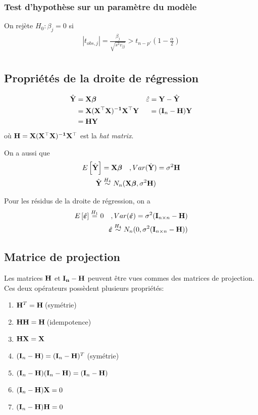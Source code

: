 \documentclass[10pt, french]{article}
\begin{document}
\begin{multicols*}{3}
\subsubsection*{Test d'hypothèse sur un paramètre du modèle}
On rejète $H_0 : \beta_j = 0$ si
\begin{align*}
|t_{obs, j}| = \frac{\beta_j}{\sqrt{s^2 v_{jj}} } > t_{n-p'}\left(1 - \frac{\alpha}{2} \right) \\
\end{align*}

\subsection*{Propriétés de la droite de régression}
\begin{align*}
	\hat{\mathbf{Y}}	& = \mathbf{X} \bm{\beta}  &&\hat{\varepsilon} = \mathbf{Y} - \hat{\mathbf{Y}}\\
		& = \mathbf{X(X^\top X)^{-1} X^\top Y} && \:\:= (\mathbf{I}_n - \mathbf{H})\mathbf{Y}	\\
		& = \mathbf{H Y} 
\end{align*}	
où $\mathbf{H = X(X^\top X)^{-1}X^\top}$ est la \textit{hat matrix}.

On a aussi que
\begin{align*}
E \left[ \hat{\mathbf{Y}} \right] & = \mathbf{X} \bm{\beta} \quad , Var(\hat{\mathbf{Y}}) = \sigma^2 \mathbf{H} \\
\hat{\mathbf{Y}} & \overset{H_4}{\sim} N_n(\mathbf{X} \bm{\beta} , \sigma^2 \mathbf{H}) \\
\end{align*}

Pour les résidus de la droite de régression, on a
\begin{align*}
E \left[ \hat{\bm{\varepsilon}} \right]  \overset{H_1}{=} 0 \quad , Var(\hat{\bm{\varepsilon}}) = \sigma^2(\mathbf{I}_{n \times n} - \mathbf{H}) \\
\hat{\bm{\varepsilon}} \overset{H_4}{\sim} N_n(0, \sigma^2 (\mathbf{I}_{n \times n} - \mathbf{H})) \\
\end{align*}

\subsection*{Matrice de projection}
Les matrices $\mathbf{H}$ et $\mathbf{I_n - H}$ peuvent être vues commes des matrices de projection. Ces deux opérateurs possèdent plusieurs propriétés:
\begin{enumerate}
	\item $\mathbf{H}^T = \mathbf{H}\:$(symétrie)
	\item $\mathbf{H}\mathbf{H} = \mathbf{H}\:$(idempotence)
	\item $\mathbf{HX} = \mathbf{X}$
	\item $(\mathbf{I}_n - \mathbf{H}) = (\mathbf{I}_n - \mathbf{H})^T\:$(symétrie)
	\item $(\mathbf{I}_n - \mathbf{H})(\mathbf{I}_n - \mathbf{H}) = (\mathbf{I}_n - \mathbf{H})$
	\item $(\mathbf{I}_n - \mathbf{H})\mathbf{X} = 0 $
	\item $(\mathbf{I}_n - \mathbf{H})\mathbf{H} = 0 $
\end{enumerate}


\end{multicols*}
\end{document}
